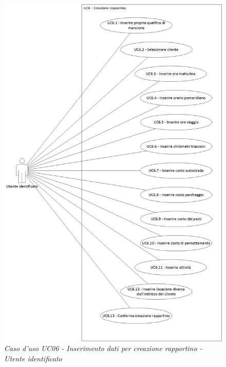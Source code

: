 	\begin{figure}[ht]
		\centering
		\includegraphics[scale=0.35]{immagini/analisi/UC06_creazione_rapportino_identificato.jpg}
		\caption{\textit{Caso d'uso UC06 - Inserimento dati per creazione rapportino - Utente identificato}}
	\end{figure}\FloatBarrier
	
